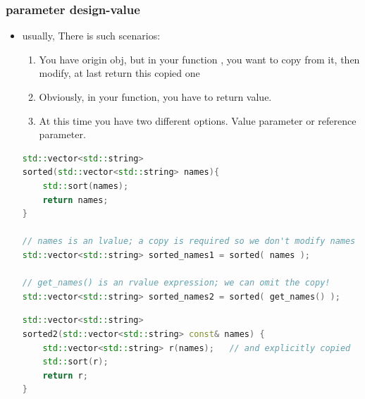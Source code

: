 \documentclass[a4paper,12pt,twoside]{book}
\begin{document}
\subsubsection{parameter design-value}
\begin{itemize}
\item usually, There is such scenarios:
\begin{enumerate}
\item You have origin obj, but in your function , you want to copy from it, then modify, at last return this copied one
\item Obviously, in your function, you have to return value.
\item At this time you have two different options. Value parameter or reference parameter.
\end{enumerate}

\begin{lstlisting}[frame=single, language=c++]
std::vector<std::string> 
sorted(std::vector<std::string> names){
    std::sort(names);
    return names;
}
 
// names is an lvalue; a copy is required so we don't modify names
std::vector<std::string> sorted_names1 = sorted( names );
 
// get_names() is an rvalue expression; we can omit the copy!
std::vector<std::string> sorted_names2 = sorted( get_names() );
\end{lstlisting}

\begin{lstlisting}[frame=single, language=c++]
std::vector<std::string> 
sorted2(std::vector<std::string> const& names) {
    std::vector<std::string> r(names);   // and explicitly copied
    std::sort(r);
    return r;
}
\end{lstlisting}


\end{itemize}
\end{document}

